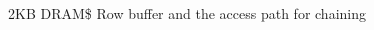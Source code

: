 \documentclass[final,t]{beamer}
\begin{document}
\begin{frame}[t,fragile]{}
\begin{columns}[t]
\begin{column}{.47\linewidth}
    \begin{figure}
        \centering
        \caption{2KB DRAM\$ Row buffer and the access path for chaining}
        \label{fig:hsa-arch}
    \end{figure}
    
\end{column}

\end{columns}

\end{frame}
\end{document}
